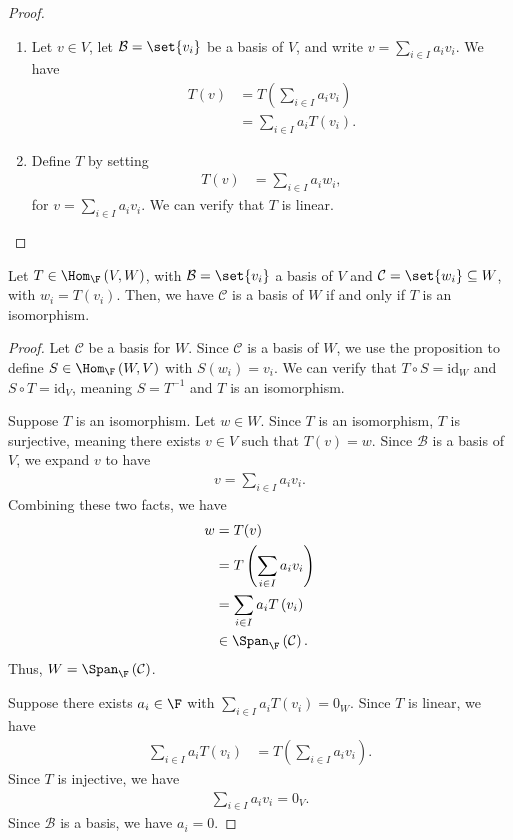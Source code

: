 \documentclass[10pt]{mypackage}
\begin{document}
\begin{proof}\hfill
  \begin{enumerate}[(1)]
    \item Let $v\in V$, let $\mathcal{B} = \set{v_i}$ be a basis of $V$, and write $v = \sum_{i\in I}a_iv_i$. We have
  \begin{align*}
    T\left(v\right) &= T\left(\sum_{i\in I}a_iv_i\right)\\
                    &= \sum_{i\in I}a_iT\left(v_i\right).
  \end{align*}
    \item  Define $T$ by setting
      \begin{align*}
        T\left(v\right) &= \sum_{i\in I}a_iw_i,
      \end{align*}
      for $v = \sum_{i\in I}a_iv_i$. We can verify that $T$ is linear.
  \end{enumerate}
\end{proof}
\begin{corollary}
  Let $T\in \Hom_{\F}\left(V,W\right)$, with $\mathcal{B} = \set{v_i}$ a basis of $V$ and $\mathcal{C} = \set{w_i}\subseteq W$, with $w_i = T\left(v_i\right)$. Then, we have $\mathcal{C}$ is a basis of $W$ if and only if $T$ is an isomorphism.
\end{corollary}
\begin{proof}
  Let $\mathcal{C}$ be a basis for $W$. Since $\mathcal{C}$ is a basis of $W$, we use the proposition to define $S\in \Hom_{\F}\left(W,V\right)$ with $S\left(w_i\right) = v_i$. We can verify that $T\circ S = \text{id}_{W}$ and $S\circ T = \text{id}_V$, meaning $S = T^{-1}$ and $T$ is an isomorphism.\newline

  Suppose $T$ is an isomorphism. Let $w\in W$. Since $T$ is an isomorphism, $T$ is surjective, meaning there exists $v\in V$ such that $T(v) = w$. Since $\mathcal{B}$ is a basis of $V$, we expand $v$ to have
  \begin{align*}
    v = \sum_{i\in I}a_iv_i.
  \end{align*}
  Combining these two facts, we have
  \begin{align*}
    w &= T(v)\\
      &= T\left(\sum_{i\in I}a_iv_i\right)\\
      &= \sum_{i\in I}a_iT\left(v_i\right)\\
      &\in \Span_{\F}\left(\mathcal{C}\right).
  \end{align*}
  Thus, $W = \Span_{\F}\left(\mathcal{C}\right)$.\newline

  Suppose there exists $a_i\in \F$ with $\sum_{i\in I}a_iT\left(v_i\right) = 0_W$. Since $T$ is linear, we have
  \begin{align*}
    \sum_{i\in I}a_iT\left(v_i\right) &= T\left(\sum_{i\in I}a_iv_i\right).
  \end{align*}
  Since $T$ is injective, we have
  \begin{align*}
    \sum_{i\in I}a_iv_i = 0_V.
  \end{align*}
  Since $\mathcal{B}$ is a basis, we have $a_i = 0$.
\end{proof}
\end{document}

